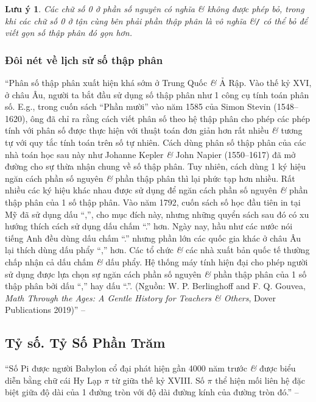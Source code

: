 \documentclass{article}
\numberwithin{equation}{section}
\newtheorem{remark}{Lưu ý}[section]
\begin{document}
\begin{remark}
	Các chữ số 0 ở phần số nguyên có nghĩa \textit{\&} không được phép bỏ, trong khi các chữ số 0 ở tận cùng bên phải phần thập phân là vô nghĩa \&\emph{\texttt{/}} có thể bỏ để viết gọn số thập phân đó gọn hơn.
\end{remark}

\subsubsection{Đôi nét về lịch sử số thập phân}
``Phân số thập phân xuất hiện khá sớm ở Trung Quốc \textit{\&} Ả Rập. Vào thế kỷ XVI, ở châu Âu, người ta bắt đầu sử dụng số thập phân như 1 công cụ tính toán phân số. E.g., trong cuốn sách ``Phần mười'' vào năm 1585 của Simon Stevin (1548--1620), ông đã chỉ ra rằng cách viết phân số theo hệ thập phân cho phép các phép tính với phân số được thực hiện với thuật toán đơn giản hơn rất nhiều \textit{\&} tương tự với quy tắc tính toán trên số tự nhiên. Cách dùng phân số thập phân của các nhà toán học sau này như Johanne Kepler \textit{\&} John Napier (1550--1617) đã mở đường cho sự thừa nhận chung về số thập phân. Tuy nhiên, cách dùng 1 ký hiệu ngăn cách phần số nguyên \textit{\&} phần thập phân thì lại phức tạp hơn nhiều. Rất nhiều các ký hiệu khác nhau được sử dụng để ngăn cách phần số nguyên \textit{\&} phần thập phân của 1 số thập phân. Vào năm 1792, cuốn sách số học đầu tiên in tại Mỹ đã sử dụng dấu ``,'', cho mục đích này, nhưng những quyển sách sau đó có xu hướng thích cách sử dụng dấu chấm ``.'' hơn. Ngày nay, hầu như các nước nói tiếng Anh đều dùng dấu chấm ``.'' nhưng phần lớn các quốc gia khác ở châu Âu lại thích dùng dấu phẩy ``,'' hơn. Các tổ chức \textit{\&} các nhà xuất bản quốc tế thường chấp nhận cả dấu chấm \textit{\&} dấu phẩy. Hệ thống máy tính hiện đại cho phép người sử dụng được lựa chọn sự ngăn cách phần số nguyên \textit{\&} phần thập phân của 1 số thập phân bởi dấu ``,'' hay dấu ``.''. (Nguồn: W. P. Berlinghoff and F. Q. Gouvea, \textit{Math Through the Ages: A Gentle History for Teachers \textit{\&} Others}, Dover Publications 2019)'' -- \cite[p. 60]{Thai_Anh_Dat_Ha_Loan_Nam_Quang_Toan_6_tap_2}

\subsection{Tỷ số. Tỷ Số Phần Trăm}
``Số Pi được người Babylon cổ đại phát hiện gần 4000 năm trước \textit{\&} được biểu diễn bằng chữ cái Hy Lạp $\pi$ từ giữa thế kỷ XVIII. Số $\pi$ thể hiện mối liên hệ đặc biệt giữa độ dài của 1 đường tròn với độ dài đường kính của đường tròn đó.'' -- \cite[p. 61]{Thai_Anh_Dat_Ha_Loan_Nam_Quang_Toan_6_tap_2}
\end{document}

